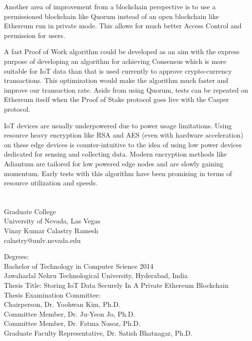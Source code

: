 \documentclass[11pt,openright]{report}
\begin{document}
Another area of improvement from a blockchain perspective is to use a permissioned blockchain like Quorum\cite{quorum} instead of an open blockchain like Ethereum run in private mode. This allows for much better Access Control and permission for users.

A fast Proof of Work algorithm could be developed as an aim with the express purpose of developing an algorithm for achieving Consensus which is more suitable for IoT data than that is used currently to approve crypto-currency transactions. This optimization would make the algorithm much faster and improve our transaction rate. Aside from using Quorum, tests can be repeated on Ethereum itself when the Proof of Stake protocol goes live with the Casper protocol.

IoT devices are usually underpowered due to power usage limitations. Using resource heavy encryption like RSA and AES (even with hardware acceleration) on these edge devices is counter-intuitive to the idea of using low power devices dedicated for sensing and collecting data. Modern encryption methods like Adiantum \cite{DBLP:journals/tosc/CrowleyB18} are tailored for low powered edge nodes and are slowly gaining momentum. Early tests with this algorithm have been promising in terms of resource utilization and speeds.




\vita
\chapter{} %
\linespread{1.3}
\begin{center}
Graduate College\\
University of Nevada, Las Vegas\\[1cm]
Vinay Kumar Calastry Ramesh\\
calastry@unlv.nevada.edu\\[1cm]
\end{center}

\noindent Degrees:\\
\indent Bachelor of Technology in Computer Science 2014\\
\indent Jawaharlal Nehru Technological University, Hyderabad, India\\

\noindent Thesis Title: Storing IoT Data Securely In A     
Private Ethereum Blockchain\\

\noindent Thesis Examination Committee:\\
\indent Chairperson, Dr. Yoohwan Kim, Ph.D.\\
\indent Committee Member, Dr. Ju-Yeon Jo, Ph.D.\\
\indent Committee Member, Dr. Fatma Nasoz, Ph.D.\\
\indent Graduate Faculty Representative, Dr. Satish Bhatnagar, Ph.D.\\
\end{document}
